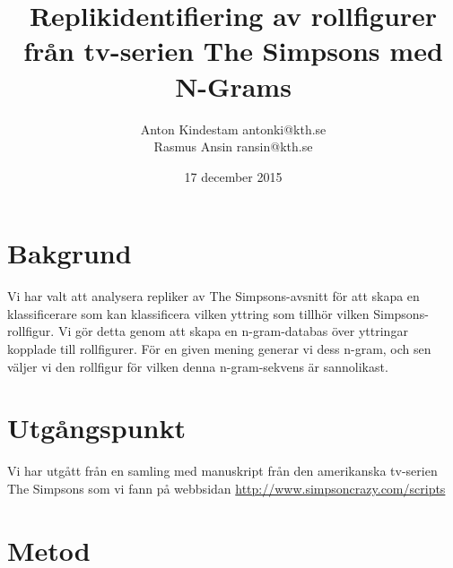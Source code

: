 \documentclass[a4paper]{article}
\author{Anton Kindestam antonki@kth.se\\Rasmus Ansin ransin@kth.se}
\title{Replikidentifiering av rollfigurer från tv-serien The Simpsons med N-Grams}
\date{17 december 2015}
\begin{document}
\maketitle
\tableofcontents


\section{Bakgrund}
Vi har valt att analysera repliker av The Simpsons-avsnitt för att skapa en
klassificerare som kan klassificera vilken yttring som tillhör vilken
Simpsons-rollfigur. Vi gör detta genom att skapa en n-gram-databas över
yttringar kopplade till rollfigurer. För en given mening generar vi dess n-gram,
och sen väljer vi den rollfigur för vilken denna n-gram-sekvens är sannolikast.


\section{Utgångspunkt}

Vi har utgått från en samling med manuskript från den amerikanska
tv-serien The Simpsons som vi fann på webbsidan
\url{http://www.simpsoncrazy.com/scripts}

\section{Metod}
\end{document}
